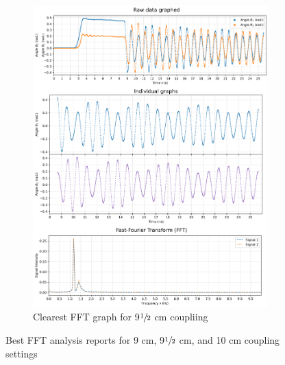 \documentclass[12pt]{article}
\begin{document}
\begin{figure}[H]
\begin{subfigure}{0.49\linewidth}
        \includegraphics[width=0.98\linewidth]{figs/beat (left_9-5_1)_cropped.png}
        \caption{Clearest FFT graph for 9$\sfrac{1}{2}$ cm coupliing}
    \end{subfigure}
    \caption{Best FFT analysis reports for 9 cm, 9$\sfrac{1}{2}$ cm, and 10 cm coupling settings}
\end{figure}
\end{document}
